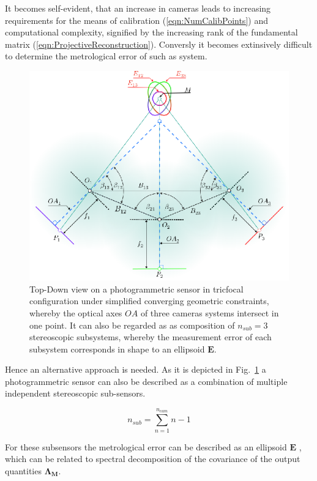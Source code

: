 \documentclass[5p,times,procedia]{elsarticle}
\begin{document}
It becomes self-evident, that an increase in cameras leads to increasing requirements for the means of calibration (\ref{eqn:NumCalibPoints}) and computational complexity, signified by the increasing rank of the fundamental matrix (\ref{eqn:ProjectiveReconstruction}). Conversly it becomes extinsively difficult to determine the metrological error 
of such as system.\\

\begin{figure}[h]
	\centering
	\includegraphics[width=0.8\linewidth]{graphics/MixedErrorCuttingGeometry.eps}
	\caption{Top-Down view on a photogrammetric sensor in tricfocal configuration under simplified converging geometric constraints, whereby the optical axes $OA$ of three cameras systems intersect in one point.		
	It can also be regarded as as composition of $n_{sub}=3$ stereoscopic subsystems, whereby the measurement error of each subsystem corresponds in shape to an ellipsoid $\mathbf{E}$.}
	\label{fig:sub_sensors}
\end{figure}

Hence an alternative approach is needed. As it is depicted in  Fig.~\ref{fig:sub_sensors} a photogrammetric sensor can also be described as a combination of multiple independent stereoscopic sub-sensors.

\begin{equation}
	\label{eqn:CovarianceMatrix}
	n_{sub} = \sum_{n=1}^{n_{cam}}n-1
\end{equation}

For these subsensors the metrological error can be described as an ellipsoid $\mathbf{E}$ \cite{Luhmann2003}, which can be related to spectral decomposition of the covariance of the output quantities $\mathbf{\Lambda_{M}}$.
\end{document}

